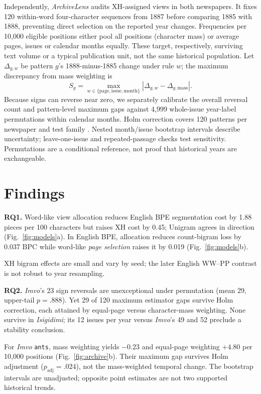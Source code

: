 \documentclass[10pt,letterpaper]{article}
\begin{document}
Independently, \emph{ArchiveLens} audits XH-assigned views in both newspapers. It fixes 120 within-word four-character sequences from 1887 before comparing 1885 with 1888, preventing direct selection on the reported year changes. Frequencies per 10,000 eligible positions either pool all positions (character mass) or average pages, issues or calendar months equally. These target, respectively, surviving text volume or a typical publication unit, not the same historical population. Let $\Delta_{g,w}$ be pattern $g$'s 1888-minus-1885 change under rule $w$; the maximum discrepancy from mass weighting is
\begin{equation}\label{eq:gap}
 S_g=\max_{w\in\{\mathrm{page,issue,month}\}}
 |\Delta_{g,w}-\Delta_{g,\mathrm{mass}}|.
\end{equation}
Because signs can reverse near zero, we separately calibrate the overall reversal count and pattern-level maximum gaps against 4,999 whole-issue year-label permutations within calendar months. Holm correction covers 120 patterns per newspaper and test family \citep{holm1979}. Nested month/issue bootstrap intervals describe uncertainty; leave-one-issue and repeated-passage checks test sensitivity. Permutations are a conditional reference, not proof that historical years are exchangeable.

\section{Findings}
\textbf{RQ1.} Word-like view allocation reduces English BPE segmentation cost by 1.88 pieces per 100 characters but raises XH cost by 0.45; Unigram agrees in direction (Fig.~\ref{fig:models}a). In English BPE, allocation reduces count-bigram loss by 0.037 BPC while word-like \emph{page selection} raises it by 0.019 (Fig.~\ref{fig:models}b).

XH bigram effects are small and vary by seed; the later English WW--PP contrast is not robust to year resampling.

\textbf{RQ2.} \emph{Imvo}'s 23 sign reversals are unexceptional under permutation (mean 29, upper-tail $p=.888$). Yet 29 of 120 maximum estimator gaps survive Holm correction, each attained by equal-page versus character-mass weighting. None survive in \emph{Isigidimi}; its 12 issues per year versus \emph{Imvo}'s 49 and 52 preclude a stability conclusion.

For \emph{Imvo} \texttt{ants}, mass weighting yields $-0.23$ and equal-page weighting $+4.80$ per 10,000 positions (Fig.~\ref{fig:archive}b). Their maximum gap survives Holm adjustment ($p_{\mathrm{adj}}=.024$), not the mass-weighted temporal change. The bootstrap intervals are unadjusted; opposite point estimates are not two supported historical trends.
\end{document}
